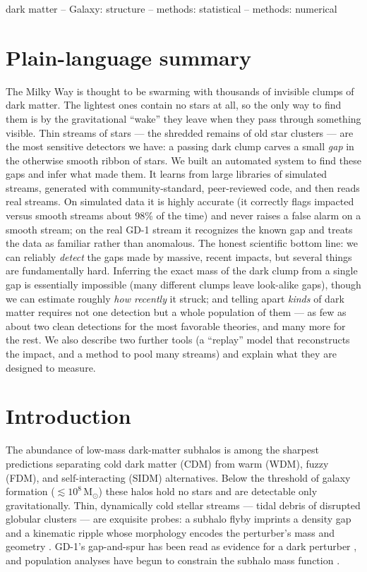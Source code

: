 \documentclass[fleqn,usenatbib]{mnras}
\newcommand{\msun}{\ensuremath{\mathrm{M}_\odot}}
\begin{document}
\begin{keywords}
dark matter -- Galaxy: structure -- methods: statistical -- methods: numerical
\end{keywords}

\section*{Plain-language summary}
The Milky Way is thought to be swarming with thousands of invisible clumps of dark
matter. The lightest ones contain no stars at all, so the only way to find them is by
the gravitational ``wake'' they leave when they pass through something visible. Thin
streams of stars --- the shredded remains of old star clusters --- are the most
sensitive detectors we have: a passing dark clump carves a small \emph{gap} in the
otherwise smooth ribbon of stars. We built an automated system to find these gaps and
infer what made them. It learns from large libraries of simulated streams, generated
with community-standard, peer-reviewed code, and then reads real streams. On simulated
data it is highly accurate (it correctly flags impacted versus smooth streams about
98\% of the time) and never raises a false alarm on a smooth stream; on the real GD-1
stream it recognizes the known gap and treats the data as familiar rather than
anomalous. The honest scientific bottom line: we can reliably \emph{detect} the gaps
made by massive, recent impacts, but several things are fundamentally hard. Inferring
the exact mass of the dark clump from a single gap is essentially impossible (many
different clumps leave look-alike gaps), though we can estimate roughly \emph{how
recently} it struck; and telling apart \emph{kinds} of dark matter requires not one
detection but a whole population of them --- as few as about two clean detections for the
most favorable theories, and many more for the rest. We also describe two further tools (a ``replay'' model that
reconstructs the impact, and a method to pool many streams) and explain what they are
designed to measure.

\section{Introduction}
The abundance of low-mass dark-matter subhalos is among the sharpest predictions
separating cold dark matter (CDM) from warm (WDM), fuzzy (FDM), and self-interacting
(SIDM) alternatives. Below the threshold of galaxy formation ($\lesssim10^8\,\msun$)
these halos hold no stars and are detectable only gravitationally. Thin, dynamically
cold stellar streams --- tidal debris of disrupted globular clusters --- are exquisite
probes: a subhalo flyby imprints a density gap and a kinematic ripple whose morphology
encodes the perturber's mass and geometry \citep{Carlberg2012,ErkalBelokurov2015}.
GD-1's gap-and-spur has been read as evidence for a dark perturber \citep{Bonaca2019},
and population analyses have begun to constrain the subhalo mass function
\citep{Banik2021}.
\end{document}
